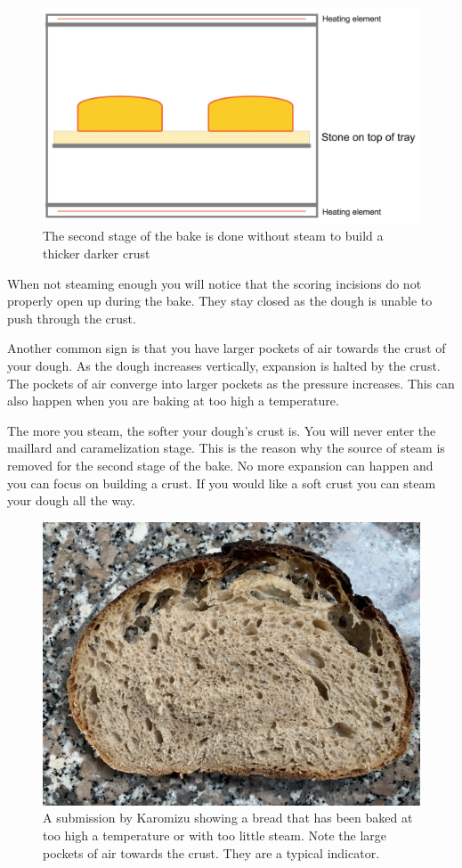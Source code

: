 \begin{figure}[!htb]
  \includegraphics[width=\textwidth]{baking-process-stage-2.jpg}
  \caption{The second stage of the bake is done without steam to build
  a thicker darker crust}
\end{figure}

When not steaming enough you will notice that the scoring
incisions do not properly open up during the bake. They stay
closed as the dough is unable to push through the crust.

Another common sign is that you have larger pockets
of air towards the crust of your dough. As the dough increases
vertically, expansion is halted by the crust. The pockets
of air converge into larger pockets as the pressure increases.
This can also happen when you are baking at too high a temperature.

The more you steam, the softer your dough's crust is. You will never
enter the maillard and caramelization stage. This
is the reason why the source of steam is removed
for the second stage of the bake. No more expansion can
happen and you can focus on building a crust. If you
would like a soft crust you can steam your dough all the
way.

\begin{figure}[!htb]
  \includegraphics[width=\textwidth]{baking-too-hot.jpeg}
  \caption{A submission by Karomizu showing a bread that has been baked
  at too high a temperature or with too little steam. Note the large
  pockets of air towards the crust. They are a typical indicator.}
\end{figure}

